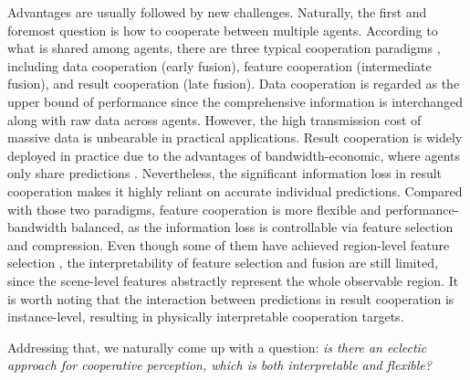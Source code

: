 \documentclass[letterpaper, 10 pt, conference]{ieeeconf}  %
\begin{document}
Advantages are usually followed by new challenges. Naturally, the first and foremost question is how to cooperate between multiple agents. According to what is shared among agents, there are three typical cooperation paradigms \cite{9732063, bai2022survey, han2023collaborative}, including data cooperation (early fusion), feature cooperation (intermediate fusion), and result cooperation (late fusion). Data cooperation \cite{9228884, cooper} is regarded as the upper bound of performance since the comprehensive information is interchanged along with raw data across agents. However, the high transmission cost of massive data is unbearable in practical applications. Result cooperation is widely deployed in practice due to the advantages of bandwidth-economic, where agents only share predictions \cite{9228884, yu2022dair}. Nevertheless, the significant information loss in result cooperation makes it highly reliant on accurate individual predictions. Compared with those two paradigms, feature cooperation \cite{fcooper, cui2022coopernaut, when2com, wang2020v2vnet, xu2022v2x, wang2023vimi, coca3d, ffnet} is more flexible and performance-bandwidth balanced, as the information loss is controllable via feature selection and compression. Even though some of them have achieved region-level feature selection \cite{where2comm}, the interpretability of feature selection and fusion are still limited, since the scene-level features abstractly represent the whole observable region. It is worth noting that the interaction between predictions in result cooperation is instance-level, resulting in physically interpretable cooperation targets.


Addressing that, we naturally come up with a question: \textit{is there an eclectic approach for cooperative perception, which is both interpretable and flexible?}
\end{document}
